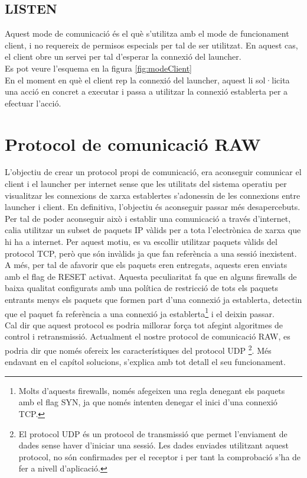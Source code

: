 \subsection{LISTEN}

Aquest mode de comunicació és el què s'utilitza amb el mode de funcionament client, i no requereix de permisos
especials per tal de ser utilitzat. En aquest cas, el client obre un servei per tal d'esperar la connexió del 
launcher.  \\

Es pot veure l'esquema en la figura \ref{fig:modeClient} \\

En el moment en què el client rep la connexió del launcher, aquest li sol·licita una acció en concret a executar
i passa a utilitzar la connexió establerta per a efectuar l'acció. \\

\section{Protocol de comunicació RAW}

L'objectiu de crear un protocol propi de comunicació, era aconseguir comunicar el client i el launcher per
internet sense que les utilitats del sistema operatiu per visualitzar les connexions de xarxa establertes
s'adonessin de les connexions entre launcher i client. En definitiva, l'objectiu és aconseguir passar més 
desapercebuts. \\

Per tal de poder aconseguir això i establir una comunicació a través d'internet, calia utilitzar un subset de 
paquets IP vàlids per a tota l'electrònica de xarxa que hi ha a internet. Per aquest motiu, es va escollir
utilitzar paquets vàlids del protocol TCP, però que són invàlids ja que fan referència a una sessió inexistent.
A més, per tal de afavorir que els paquets eren entregats, aquests eren enviats amb el flag de RESET activat. 
Aquesta peculiaritat fa que en alguns firewalls de baixa qualitat configurats amb una política de restricció de 
tots els paquets entrants menys els paquets que formen part d'una connexió ja establerta, detectin que el paquet
fa referència a una connexió ja establerta\footnote{Molts d'aquests firewalls, només afegeixen una regla denegant
els paquets amb el flag SYN, ja que només intenten denegar el inici d'una connexió TCP.} i el deixin passar. \\

Cal dir que aquest protocol es podria millorar força tot afegint algoritmes de control i retransmissió. Actualment
el nostre protocol de comunicació RAW, es podria dir que només ofereix les característiques del protocol UDP
\footnote{El protocol UDP és un protocol de transmissió que permet l'enviament de dades sense haver d'iniciar una 
sessió. Les dades enviades utilitzant aquest protocol, no són confirmades per el receptor i per tant la comprobació
s'ha de fer a nivell d'aplicació.}. Més endavant en el capítol solucions, s'explica amb tot detall el seu funcionament. \\

